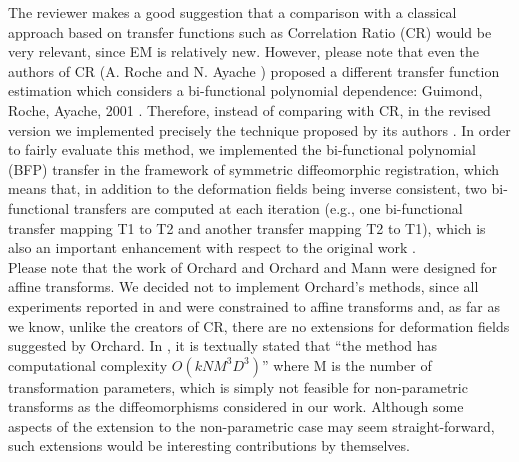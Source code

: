 \documentclass[onecolumn]{IEEEtran}
\begin{document}
The reviewer makes a good suggestion that a comparison with a classical approach based on transfer functions such as Correlation Ratio (CR) would be very relevant, since EM is relatively new. However, please note that even the authors of CR (A. Roche and N. Ayache \cite{Roche1998}) proposed a different transfer function estimation which considers a bi-functional polynomial dependence: Guimond, Roche, Ayache, 2001 \cite{Guimond2001}. Therefore, instead of comparing with CR, in the revised version we implemented precisely the technique proposed by its authors \cite{Guimond2001}. In order to fairly evaluate this method, we implemented the bi-functional polynomial (BFP) transfer in the framework of symmetric diffeomorphic registration, which means that, in addition to the deformation fields being inverse consistent, two bi-functional transfers are computed at each iteration (e.g., one bi-functional transfer mapping T1 to T2 and another transfer mapping T2 to T1), which is also an important enhancement with respect to the original work \cite{Guimond2001}.\\

Please note that the work of Orchard \cite{Orchard2008} and Orchard and Mann \cite{Orchard2010} were designed for affine transforms. We decided not to implement Orchard's methods, since all experiments reported in \cite{Orchard2008} and \cite{Orchard2010} were constrained to affine transforms and, as far as we know, unlike the creators of CR, there are no extensions for deformation fields suggested by Orchard. In \cite{Orchard2010}, it is textually stated that “the method has computational complexity $O(k N M^3 D^3)$” where M is the number of transformation parameters, which is simply not feasible for non-parametric transforms as the diffeomorphisms considered in our work. Although some aspects of the extension to the non-parametric case may seem straight-forward, such extensions would be interesting contributions by themselves.\\
\end{document}
